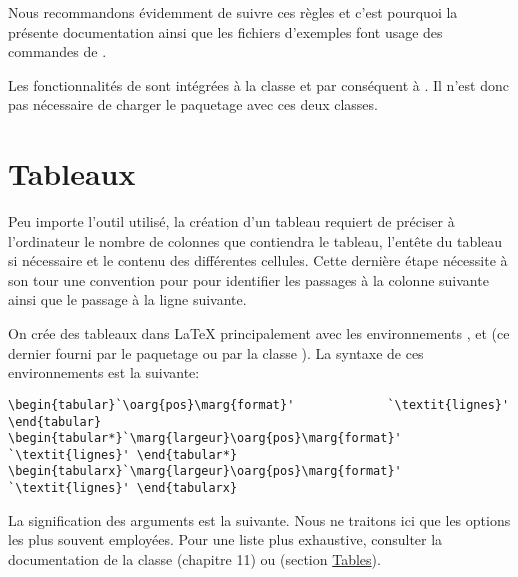 Nous recommandons évidemment de suivre ces règles et c'est pourquoi la
présente documentation ainsi que les fichiers d'exemples font usage
des commandes de .

Les fonctionnalités de  sont intégrées à la classe
 et par conséquent à . Il n'est donc pas
nécessaire de charger le paquetage avec ces deux classes.



\section{Tableaux}
\label{sec:tableaux:tableaux}

Peu importe l'outil utilisé, la création d'un tableau requiert de
préciser à l'ordinateur le nombre de colonnes que contiendra le
tableau, l'entête du tableau si nécessaire et le contenu des
différentes cellules. Cette dernière étape nécessite à son tour une
convention pour pour identifier les passages à la colonne suivante
ainsi que le passage à la ligne suivante.

On crée des tableaux dans {\LaTeX} principalement avec les
environnements ,  et 
(ce dernier fourni par le paquetage  ou par la classe
). La syntaxe de ces environnements est la suivante:
\begin{lstlisting}
\begin{tabular}`\oarg{pos}\marg{format}'             `\textit{lignes}' \end{tabular}
\begin{tabular*}`\marg{largeur}\oarg{pos}\marg{format}' `\textit{lignes}' \end{tabular*}
\begin{tabularx}`\marg{largeur}\oarg{pos}\marg{format}' `\textit{lignes}' \end{tabularx}
\end{lstlisting}
La signification des arguments est la suivante. Nous ne traitons ici
que les options les plus souvent employées. Pour une liste plus
exhaustive, consulter la documentation de la classe 
(chapitre 11) ou \cite{wikibooks:latex} (section
\href{http://en.wikibooks.org/wiki/LaTeX/Tables}{Tables}).

